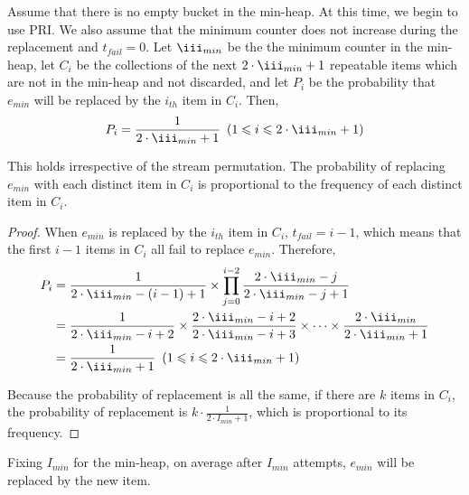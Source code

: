 \begin{theorem}
	\label{theo:second}
	Assume that there is no empty bucket in the min-heap. At this time, we begin to use PRI. We also assume that the minimum counter does not increase during the replacement and $t_{fail} = 0$. Let $\iii_{min}$ be the the minimum counter in the min-heap, let $C_i$ be the collections of the next $2\cdot\iii_{min} + 1$ repeatable items which are not in the min-heap and not discarded, and let $P_i$ be the probability that $e_{min}$ will be replaced by the $i_{th}$ item in $C_i$. Then, 
	\begin{equation}
    \begin{aligned}
    P_i = \frac{1}{2\cdot\iii_{min}+1} \ \left(1 \leqslant i \leqslant 2\cdot\iii_{min}+1\right)
    \end{aligned}
    \end{equation}

This holds irrespective of the stream permutation.
The probability of replacing $e_{min}$ with each distinct item in $C_i$ is proportional to the frequency of each distinct item in $C_i$.
\end{theorem}

\begin{proof}
When $e_{min}$ is replaced by the $i_{th}$ item in $C_i$, $t_{fail} = i - 1$, which means that the first $i-1$ items in $C_i$ all fail to replace $e_{min}$.
Therefore, 
\begin{equation}
\begin{aligned}
\centering  
P_i &= \frac{1}{2\cdot\iii_{min}-\left(i-1\right)+1} \times \prod_{j=0}^{i-2} \frac{2\cdot\iii_{min}-j}{2\cdot\iii_{min}-j+1}\\
&= \frac{1}{2\cdot\iii_{min}-i+2} \times \frac{2\cdot\iii_{min}-i+2}{2\cdot\iii_{min}-i+3} \times
\cdots \times \frac{2\cdot\iii_{min}}{2\cdot\iii_{min}+1}\\
&= \frac{1}{2\cdot\iii_{min}+1} \ \left(1 \leqslant i \leqslant 2\cdot\iii_{min}+1\right)
\end{aligned}
\end{equation}

Because the probability of replacement is all the same, if there are $k$ items in $C_i$, the probability of replacement is $k\cdot \frac{1}{2\cdot I_{min}+1}$, which is proportional to its frequency.
\end{proof}

\begin{theorem}
	Fixing $I_{min}$ for the min-heap, on average after $I_{min}$ attempts, $e_{min}$ will be replaced by the new item.
\end{theorem}

